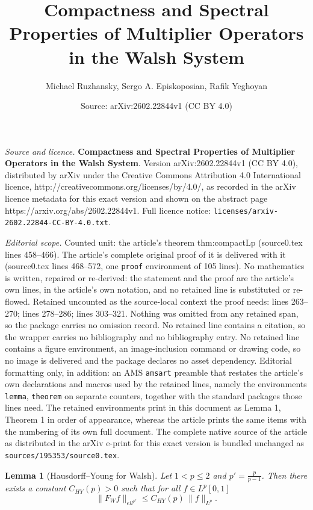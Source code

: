 \documentclass[10pt,a4paper]{amsart}
\title{\textbf{Compactness and Spectral Properties of Multiplier Operators in the Walsh System}}
\author{Michael Ruzhansky, Sergo A. Episkoposian, Rafik Yeghoyan}
\date{Source: arXiv:2602.22844v1 (CC BY 4.0)}
\newtheorem{lemma}{Lemma}
\newcommand{\F}{\mathcal{F}_W}
\newcommand{\Lp}{L^p[0,1]}
\def\ell{ell}%
\def\mathcal#1{#1}%
\begin{document}
\maketitle

\noindent\emph{Source and licence.} \textbf{Compactness and Spectral Properties of Multiplier Operators in the Walsh System}. Version arXiv:2602.22844v1 (CC BY 4.0), distributed by arXiv under the Creative Commons Attribution 4.0 International licence, http://creativecommons.org/licenses/by/4.0/, as recorded in the arXiv licence metadata for this exact version and shown on the abstract page https://arxiv.org/abs/2602.22844v1. Full licence notice: \texttt{licenses/arxiv-2602.22844-CC-BY-4.0.txt}.\par\smallskip

\noindent\textit{Editorial scope.} Counted unit: the article's theorem thm:compactLp (source0.tex lines 458--466). The article's complete original proof of it is delivered with it (source0.tex lines 468--572, one \texttt{proof} environment of 105 lines). No mathematics is written, repaired or re-derived: the statement and the proof are the article's own lines, in the article's own notation, and no retained line is substituted or re-flowed.  Retained uncounted as the source-local context the proof needs: lines 263--270; lines 278--286; lines 303--321.  Nothing was omitted from any retained span, so the package carries no omission record.  No retained line contains a citation, so the wrapper carries no bibliography and no bibliography entry.  No retained line contains a figure environment, an image-inclusion command or drawing code, so no image is delivered and the package declares no asset dependency.  Editorial formatting only, in addition: an AMS \texttt{amsart} preamble that restates the article's own declarations and macros used by the retained lines, namely the environments \texttt{lemma}, \texttt{theorem} on separate counters, together with the standard packages those lines need.  The retained environments print in this document as Lemma 1, Theorem 1 in order of appearance, whereas the article prints the same items with the numbering of its own full document.  The complete native source of the article as distributed in the arXiv e-print for this exact version is bundled unchanged as \texttt{sources/195353/source0.tex}.
\begin{lemma}[Hausdorff–Young for Walsh]
\label{lem:HY}
Let $1<p\le 2$ and $p'=\frac{p}{p-1}$.
Then there exists a constant $C_{HY}(p)>0$ such that for all $f\in \Lp$
\[
\|\F f\|_{\ell^{p'}} \le C_{HY}(p)\,\|f\|_{L^p}.
\]
\end{lemma}
\end{document}
